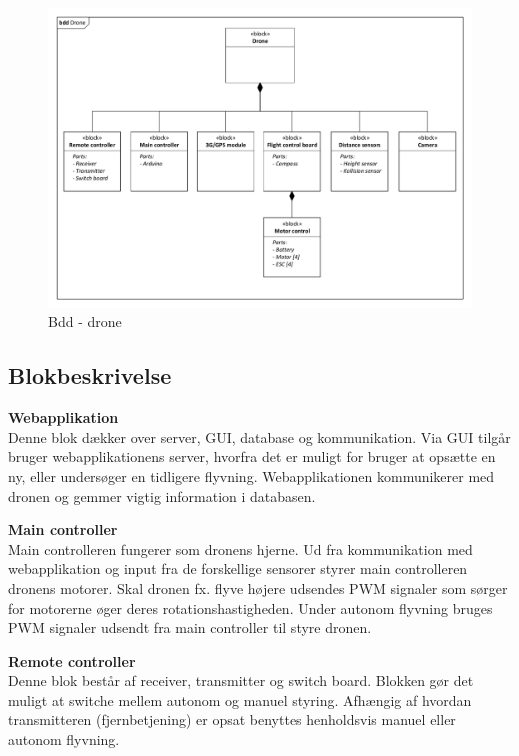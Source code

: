 \begin{figure}[H]
\centering
\includegraphics[width=1.\textwidth]{Billeder/BDD/bdd_drone.pdf}
\caption{Bdd - drone}
\label{fig:bdd_drone}
\end{figure}

\newpage

\subsection{Blokbeskrivelse}

\textbf{Webapplikation}\\
Denne blok dækker over server, GUI, database og kommunikation. Via GUI tilgår bruger webapplikationens server, hvorfra det er muligt for bruger at opsætte en ny, eller undersøger en tidligere flyvning. Webapplikationen kommunikerer med dronen og gemmer vigtig information i databasen.

\textbf{Main controller}\\
Main controlleren fungerer som dronens hjerne. Ud fra kommunikation med webapplikation og input fra de forskellige sensorer styrer main controlleren dronens motorer. Skal dronen fx. flyve højere udsendes PWM signaler som sørger for motorerne øger deres rotationshastigheden. Under autonom flyvning bruges PWM signaler udsendt fra main controller til styre dronen. 

\textbf{Remote controller}\\
Denne blok består af receiver, transmitter og switch board. Blokken gør det muligt at switche mellem autonom og manuel styring. Afhængig af hvordan transmitteren (fjernbetjening) er opsat benyttes henholdsvis manuel eller autonom flyvning.

